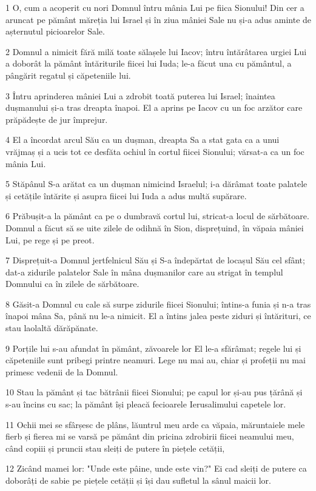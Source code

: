 \par 1 O, cum a acoperit cu nori Domnul întru mânia Lui pe fiica Sionului! Din cer a aruncat pe pământ măreția lui Israel și în ziua mâniei Sale nu și-a adus aminte de așternutul picioarelor Sale.
\par 2 Domnul a nimicit fără milă toate sălașele lui Iacov; întru întărâtarea urgiei Lui a doborât la pământ întăriturile fiicei lui Iuda; le-a făcut una cu pământul, a pângărit regatul și căpeteniile lui.
\par 3 Întru aprinderea mâniei Lui a zdrobit toată puterea lui Israel; înaintea dușmanului și-a tras dreapta înapoi. El a aprins pe Iacov cu un foc arzător care prăpădește de jur împrejur.
\par 4 El a încordat arcul Său ca un dușman, dreapta Sa a stat gata ca a unui vrăjmaș și a ucis tot ce desfăta ochiul în cortul fiicei Sionului; vărsat-a ca un foc mânia Lui.
\par 5 Stăpânul S-a arătat ca un dușman nimicind Israelul; i-a dărâmat toate palatele și cetățile întărite și asupra fiicei lui Iuda a adus multă supărare.
\par 6 Prăbușit-a la pământ ca pe o dumbravă cortul lui, stricat-a locul de sărbătoare. Domnul a făcut să se uite zilele de odihnă în Sion, disprețuind, în văpaia mâniei Lui, pe rege și pe preot.
\par 7 Disprețuit-a Domnul jertfelnicul Său și S-a îndepărtat de locașul Său cel sfânt; dat-a zidurile palatelor Sale în mâna dușmanilor care au strigat în templul Domnului ca în zilele de sărbătoare.
\par 8 Găsit-a Domnul cu cale să surpe zidurile fiicei Sionului; întins-a funia și n-a tras înapoi mâna Sa, până nu le-a nimicit. El a întins jalea peste ziduri și întărituri, ce stau laolaltă dărăpănate.
\par 9 Porțile lui s-au afundat în pământ, zăvoarele lor El le-a sfărâmat; regele lui și căpeteniile sunt pribegi printre neamuri. Lege nu mai au, chiar și profeții nu mai primesc vedenii de la Domnul.
\par 10 Stau la pământ și tac bătrânii fiicei Sionului; pe capul lor și-au pus țărână și s-au încins cu sac; la pământ își pleacă fecioarele Ierusalimului capetele lor.
\par 11 Ochii mei se sfârșesc de plâns, lăuntrul meu arde ca văpaia, măruntaiele mele fierb și fierea mi se varsă pe pământ din pricina zdrobirii fiicei neamului meu, când copiii și pruncii stau sleiți de putere în piețele cetății,
\par 12 Zicând mamei lor: "Unde este pâine, unde este vin?" Ei cad sleiți de putere ca doborâți de sabie pe piețele cetății și își dau sufletul la sânul maicii lor.
